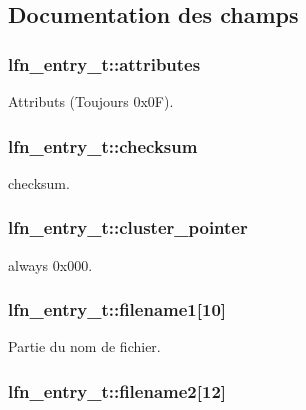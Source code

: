 \subsection{\-Documentation des champs}
\hypertarget{structlfn__entry__t_a5b1eb8b963f05e47b3d6508b5a986985}{
\subsubsection[{attributes}]{ {\bf lfn\-\_\-entry\-\_\-t\-::attributes}}}\label{structlfn__entry__t_a5b1eb8b963f05e47b3d6508b5a986985}
\-Attributs (\-Toujours 0x0\-F). \hypertarget{structlfn__entry__t_a1a60017a7c8b7502fefc8358a821f0ae}{
\subsubsection[{checksum}]{ {\bf lfn\-\_\-entry\-\_\-t\-::checksum}}}\label{structlfn__entry__t_a1a60017a7c8b7502fefc8358a821f0ae}
checksum. \hypertarget{structlfn__entry__t_a6f3355b0c241c7a5936c04dccf1614ca}{
\subsubsection[{cluster\-\_\-pointer}]{ {\bf lfn\-\_\-entry\-\_\-t\-::cluster\-\_\-pointer}}}\label{structlfn__entry__t_a6f3355b0c241c7a5936c04dccf1614ca}
always 0x000. \hypertarget{structlfn__entry__t_a04e5c493f02fa433b7d7d2d489c89e60}{
\subsubsection[{filename1}]{ {\bf lfn\-\_\-entry\-\_\-t\-::filename1}\mbox{[}10\mbox{]}}}\label{structlfn__entry__t_a04e5c493f02fa433b7d7d2d489c89e60}
\-Partie du nom de fichier. \hypertarget{structlfn__entry__t_ab88e34e402a566da06c83163e94a1763}{
\subsubsection[{filename2}]{ {\bf lfn\-\_\-entry\-\_\-t\-::filename2}\mbox{[}12\mbox{]}}}\label{structlfn__entry__t_ab88e34e402a566da06c83163e94a1763}
